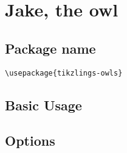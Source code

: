 \documentclass[parskip=half]{scrartcl}
\begin{document}
\begin{tcblisting}{}
\marmot[rightstep]
\end{tcblisting}

\begin{tcblisting}{}
\marmot[3D]
\end{tcblisting}


\clearpage
\section[\textbackslash owl]{Jake, the owl}

\subsection{Package name}

\begin{tcolorbox}
\vspace*{0.5cm}
\lstinline|\usepackage{tikzlings-owls}|
\vspace*{0.5cm}
\end{tcolorbox}

\subsection{Basic Usage}

\begin{tcblisting}{}
\owl
\end{tcblisting}

\subsection{Options}

\begin{tcblisting}{}
\owl[body=SteelBlue]
\end{tcblisting}

\begin{tcblisting}{}
\owl[eye=red]
\end{tcblisting}

\begin{tcblisting}{}
\owl[pupil=red]
\end{tcblisting}

\begin{tcblisting}{}
\owl[bill=red]
\end{tcblisting}

\begin{tcblisting}{}
\owl[feet=red]
\end{tcblisting}
\end{document}
